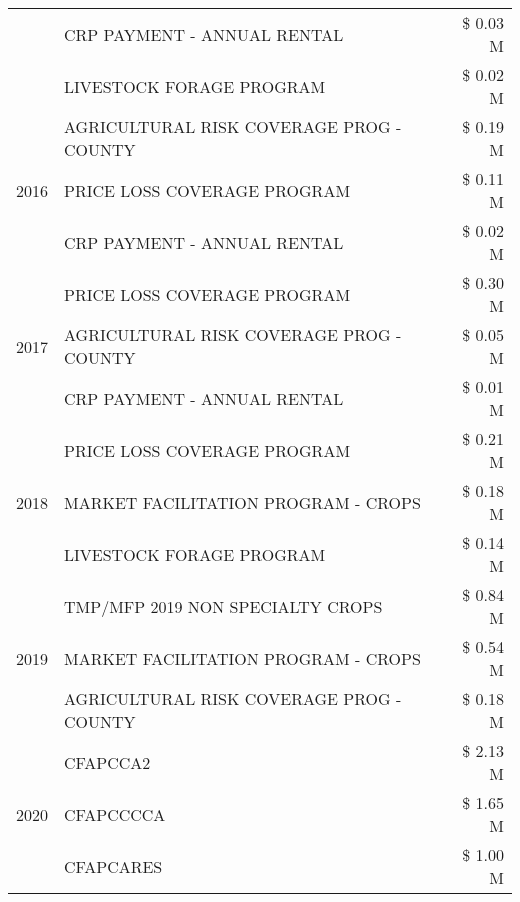 \begin{tabular}{llr}
 & CRP PAYMENT - ANNUAL RENTAL & \$ 0.03 M \\
 & LIVESTOCK FORAGE PROGRAM & \$ 0.02 M \\
\cline{1-3}
\multirow[t]{3}{*}{2016} & AGRICULTURAL RISK COVERAGE PROG - COUNTY & \$ 0.19 M \\
 & PRICE LOSS COVERAGE PROGRAM & \$ 0.11 M \\
 & CRP PAYMENT - ANNUAL RENTAL & \$ 0.02 M \\
\cline{1-3}
\multirow[t]{3}{*}{2017} & PRICE LOSS COVERAGE PROGRAM & \$ 0.30 M \\
 & AGRICULTURAL RISK COVERAGE PROG - COUNTY & \$ 0.05 M \\
 & CRP PAYMENT - ANNUAL RENTAL & \$ 0.01 M \\
\cline{1-3}
\multirow[t]{3}{*}{2018} & PRICE LOSS COVERAGE PROGRAM & \$ 0.21 M \\
 & MARKET FACILITATION PROGRAM - CROPS & \$ 0.18 M \\
 & LIVESTOCK FORAGE PROGRAM & \$ 0.14 M \\
\cline{1-3}
\multirow[t]{3}{*}{2019} & TMP/MFP 2019 NON SPECIALTY CROPS & \$ 0.84 M \\
 & MARKET FACILITATION PROGRAM - CROPS & \$ 0.54 M \\
 & AGRICULTURAL RISK COVERAGE PROG - COUNTY & \$ 0.18 M \\
\cline{1-3}
\multirow[t]{3}{*}{2020} & CFAPCCA2 & \$ 2.13 M \\
 & CFAPCCCCA & \$ 1.65 M \\
 & CFAPCARES & \$ 1.00 M \\
\cline{1-3}
\bottomrule
\end{tabular}
